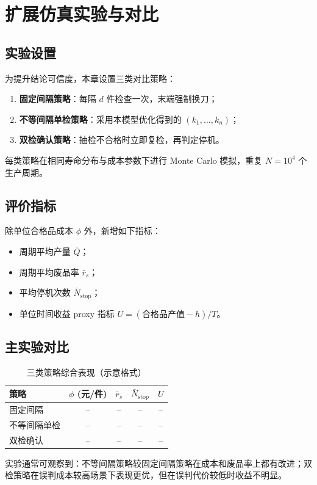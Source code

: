 \chapter{扩展仿真实验与对比}

\section{实验设置}
为提升结论可信度，本章设置三类对比策略：
\begin{enumerate}
  \item \textbf{固定间隔策略}：每隔 $d$ 件检查一次，末端强制换刀；
  \item \textbf{不等间隔单检策略}：采用本模型优化得到的 $(k_1,\ldots,k_n)$；
  \item \textbf{双检确认策略}：抽检不合格时立即复检，再判定停机。
\end{enumerate}
每类策略在相同寿命分布与成本参数下进行 Monte Carlo 模拟，重复 $N=10^4$ 个生产周期。

\section{评价指标}
除单位合格品成本 $\phi$ 外，新增如下指标：
\begin{itemize}
  \item 周期平均产量 $\bar Q$；
  \item 周期平均废品率 $\bar r_s$；
  \item 平均停机次数 $\bar N_{\text{stop}}$；
  \item 单位时间收益 proxy 指标 $U=(\text{合格品产值}-h)/T$。
\end{itemize}

\section{主实验对比}
\begin{table}[H]
\centering
\caption{三类策略综合表现（示意格式）}
\begin{tabular}{lcccc}
\toprule
策略 & $\phi$ (元/件) & $\bar r_s$ & $\bar N_{\text{stop}}$ & $U$ \\
\midrule
固定间隔 & -- & -- & -- & -- \\
不等间隔单检 & -- & -- & -- & -- \\
双检确认 & -- & -- & -- & -- \\
\bottomrule
\end{tabular}
\end{table}

实验通常可观察到：不等间隔策略较固定间隔策略在成本和废品率上都有改进；双检策略在误判成本较高场景下表现更优，但在误判代价较低时收益不明显。

